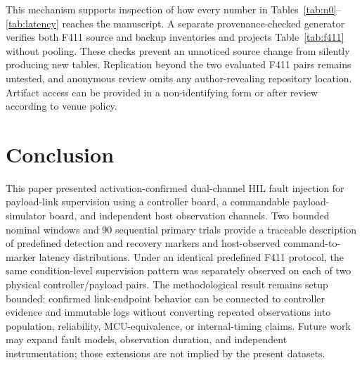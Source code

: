 \documentclass[conference]{IEEEtran}
\begin{document}
This mechanism supports inspection of how every number in Tables~\ref{tab:n0}--\ref{tab:latency} reaches the manuscript. A separate provenance-checked generator verifies both F411 source and backup inventories and projects Table~\ref{tab:f411} without pooling. These checks prevent an unnoticed source change from silently producing new tables. Replication beyond the two evaluated F411 pairs remains untested, and anonymous review omits any author-revealing repository location. Artifact access can be provided in a non-identifying form or after review according to venue policy.

\section{Conclusion}

This paper presented activation-confirmed dual-channel HIL fault injection for payload-link supervision using a controller board, a commandable payload-simulator board, and independent host observation channels. Two bounded nominal windows and 90 sequential primary trials provide a traceable description of predefined detection and recovery markers and host-observed command-to-marker latency distributions. Under an identical predefined F411 protocol, the same condition-level supervision pattern was separately observed on each of two physical controller/payload pairs. The methodological result remains setup bounded: confirmed link-endpoint behavior can be connected to controller evidence and immutable logs without converting repeated observations into population, reliability, MCU-equivalence, or internal-timing claims. Future work may expand fault models, observation duration, and independent instrumentation; those extensions are not implied by the present datasets.

\balance


\end{document}
